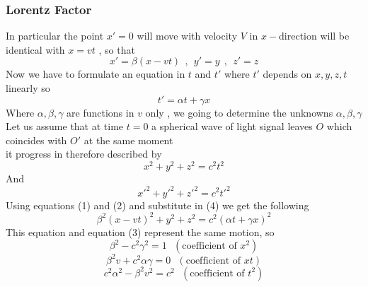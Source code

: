 \subsubsection{Lorentz Factor}
In particular the point $x' = 0$ will move with velocity $V$ in $x-$direction will be identical with $x=vt$ , so that 
\setcounter{equation}{0}
\begin{equation}
    x' = \beta(x-vt)
    \ \ , \ \
    y' = y 
    \ \ , \ \
    z' = z
\end{equation}
Now we have to formulate an equation in $t$ and $t'$ where $t'$ depends on $x,y,z,t$ linearly so 
\begin{equation}
    t' = \alpha t + \gamma x
\end{equation}
Where $\alpha , \beta , \gamma$ are functions in $v$ only , we going to determine the unknowns $\alpha , \beta , \gamma$\\
Let us assume that at time $t=0$ a spherical wave of light signal leaves $O$ which coincides with $O'$ at the same moment\\
it progress in therefore described by 
\begin{equation}
    x^2+y^2+z^2=c^2t^2
\end{equation}
And
\begin{equation}
    {x'}^2+{y'}^2+{z'}^2=c^2{t'}^2
\end{equation}
Using equations (1) and (2) and substitute in (4)
we get the following
\begin{equation}
    \label{eq:5.1}
    \beta^2{(x-vt)}^2+y^2+z^2=c^2{(\alpha t + \gamma x)}^2
\end{equation}
This equation and equation (3) represent the same motion, so 
\begin{equation}
    \beta^2-c^2\gamma^2 = 1 \ \ \ (\text{coefficient of }x^2)
\end{equation}
\begin{equation}
    \beta^2 v +c^2\alpha\gamma = 0 \ \ \ (\text{coefficient of }xt)
\end{equation}
\begin{equation}
    c^2\alpha^2 - \beta^2 v^2  = c^2   \ \ \ (\text{coefficient of }t^2)
\end{equation}

